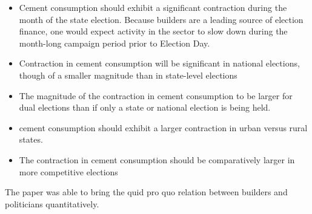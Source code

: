 \begin{itemize}

\item Cement consumption should exhibit a significant contraction during the month of the state election. Because builders are a leading source of election finance, one would expect activity in the sector to slow down during the month-long campaign period prior to Election Day.

\item Contraction in cement consumption will be significant in national elections, though of a smaller magnitude than in state-level elections

\item The magnitude of the contraction in cement consumption to be larger for dual elections than if only a state or national election is being held.

\item cement consumption should exhibit a larger contraction in urban versus rural states.

\item The contraction in cement consumption should be comparatively larger in more competitive elections

\end{itemize}
 
 The paper was able to bring the quid pro quo relation between builders and politicians quantitatively.
